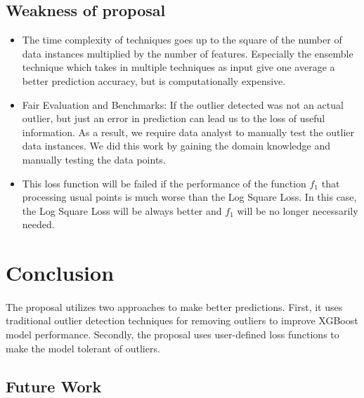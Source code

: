 \documentclass[runningheads]{llncs}
\begin{document}
\subsection{Weakness of proposal}
\begin{itemize}
    \item The time complexity of techniques goes up to the square of the number of data instances multiplied by the number of features. Especially the ensemble technique which takes in multiple techniques as input give one average a better prediction accuracy, but is computationally expensive.
    \item Fair Evaluation and Benchmarks: If the outlier detected was not an actual outlier, but just an error in prediction can lead us to the loss of useful information. As a result, we require data analyst to manually test the outlier data instances. We did this work by gaining the domain knowledge and manually testing the data points.
    \item This loss function will be failed if the performance of the function $f_1$ that processing usual points is much worse than the Log Square Loss. In this case, the Log Square Loss will be always better and $f_1$ will be no longer necessarily needed. 
\end{itemize}

\section{Conclusion}
\paragraph{} The proposal utilizes two approaches to make better predictions. First, it uses traditional outlier detection techniques for removing outliers to improve XGBoost model performance. Secondly, the proposal uses user-defined loss functions to make the model tolerant of outliers.


\subsection{Future Work}

\end{document}
